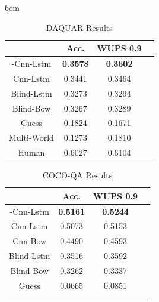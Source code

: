 \documentclass{article}
\renewcommand{\#}[1]{\textbf{#1}}
\begin{document}
\begin{table}[h]
\caption{DAQUAR Results}
\label{tab:daquar_results}
\vskip 0.15in
\begin{center}
\begin{small}
\begin{sc}
\begin{minipage*}{6cm}
\begin{tabular}{c c c c}
\hline
\abovespace
\belowspace
            & Acc.     & WUPS 0.9 \\
\hline
\abovespace
2-Cnn-Lstm  &\#{0.3578}&\#{0.3602}\\
Cnn-Lstm    & 0.3441   & 0.3464   \\
Blind-Lstm  & 0.3273   & 0.3294   \\
Blind-Bow   & 0.3267   & 0.3289   \\
Guess       & 0.1824   & 0.1671   \\
\belowspace
Multi-World & 0.1273   & 0.1810   \\
\hline
\abovespace
\belowspace
Human       & 0.6027   &  0.6104  \\
\hline
\end{tabular}
\end{minipage*}
\end{sc}
\end{small}
\end{center}
\end{table}

\begin{table}[h]
\caption{COCO-QA Results}
\label{tab:cocoqa_results}
\vskip 0.15in
\begin{center}
\begin{small}
\begin{sc}
\begin{tabular}{c c c c}
\hline
\abovespace\belowspace
           & Acc.     & WUPS 0.9 \\
\hline
\abovespace
2-Cnn-Lstm &\#{0.5161}&\#{0.5244}\\
Cnn-Lstm   & 0.5073   & 0.5153   \\
Cnn-Bow    & 0.4490   & 0.4593   \\
Blind-Lstm & 0.3516   & 0.3592   \\
Blind-Bow  & 0.3262   & 0.3337   \\
\belowspace
Guess      & 0.0665   & 0.0851   \\
\hline
\abovespace
\end{tabular}
\end{sc}
\end{small}
\end{center}
\end{table}
\end{document}
